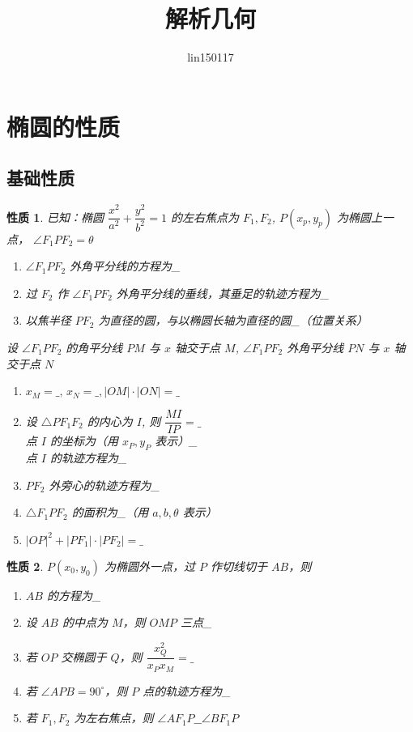 \documentclass[a4paper,10pt,twoside]{article}
\title{解析几何}
\author{lin150117}
\date{}
\newtheorem{proposition}{性质}
\begin{document}
\maketitle
\tableofcontents
\newpage
\setlength{\parindent}{0pt}
\section{椭圆的性质}
\subsection{基础性质}
\begin{proposition}
    已知：椭圆 $ \dfrac{x^2}{a^2}+\dfrac{y^2}{b^2}=1 $ 的左右焦点为 $ F_1,F_2 $, $ P(x_p,y_p) $ 为椭圆上一点， $ \angle F_1PF_2=\theta $ 
    \begin{enumerate}[ $ (1) $ ]
        \item  $ \angle F_1PF_2 $ 外角平分线的方程为\_
        \item 过 $ F_2 $ 作 $ \angle F_1PF_2 $ 外角平分线的垂线，其垂足的轨迹方程为\_
        \item 以焦半径 $ PF_2 $ 为直径的圆，与以椭圆长轴为直径的圆\_（位置关系）
    \end{enumerate} 
    设 $ \angle F_1PF_2 $ 的角平分线 $ PM $ 与 $ x  $ 轴交于点 $ M $, $ \angle F_1PF_2 $ 外角平分线 $ PN $ 与 $ x  $ 轴交于点 $ N $
    \begin{enumerate}
        \item[ $ (4) $ ]  $ x_M=\_,\,x_N=\_,|OM|\cdot|ON|=\_ $
        \item[ $ (5) $ ] 设 $ \triangle PF_1F_2 $ 的内心为 $ I  $, 则 $ \dfrac{MI}{IP}=\_ $\\点 $ I $ 的坐标为（用 $ x_P,y_P  $ 表示）\_\\点 $ I  $ 的轨迹方程为\_
        \item[ $ (6) $ ]  $ PF_2 $ 外旁心的轨迹方程为\_
        \item[ $ (7) $ ]  $ \triangle F_1PF_2 $ 的面积为\_（用 $ a,b,\theta $ 表示）
        \item[ $ (8) $ ]  $ |OP|^2+|PF_1|\cdot|PF_2|=\_ $    
    \end{enumerate}   
\end{proposition}
\begin{proposition}
     $ P(x_0,y_0) $ 为椭圆外一点，过 $ P  $ 作切线切于 $ AB $，则
     \begin{enumerate}[ $ (1) $ ]
        \item  $ AB  $ 的方程为\_
        \item 设 $ AB  $ 的中点为 $ M  $，则 $ OMP  $ 三点\_
        \item 若 $ OP  $ 交椭圆于 $ Q  $，则 $ \dfrac{x_Q^2}{x_Px_M}=\_ $
        \item 若 $ \angle APB =90^{\circ} $，则 $ P  $ 点的轨迹方程为\_
        \item 若 $ F_1,F_2  $ 为左右焦点，则 $ \angle AF_1P\_\_\angle BF_1P $   
     \end{enumerate} 
\end{proposition}
\end{document}
